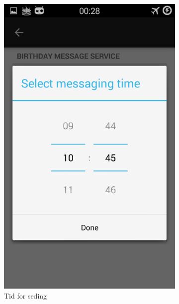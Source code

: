 \begin{figure}[ht]
    \begin{subfigure}[b]{0.35\textwidth}
        \includegraphics[width=\textwidth]{./img/8.png}
        \caption{Tid for seding}
        \label{fig:melding_tid}
    \end{subfigure}
    \begin{subfigure}[b]{0.35\textwidth}

\end{subfigure}
\end{figure}
